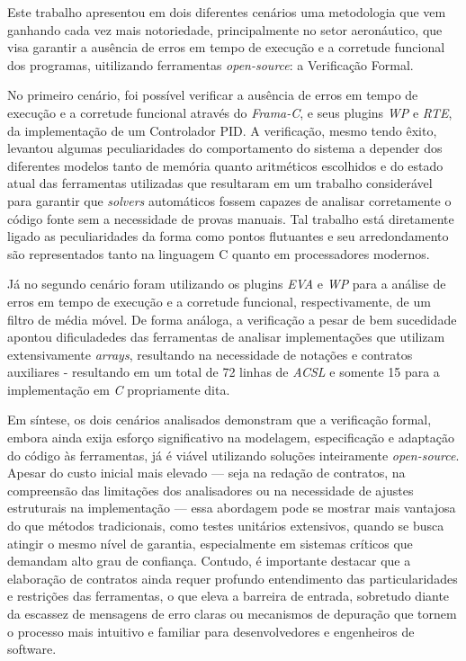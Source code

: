 \documentclass{article}
\begin{document}
Este trabalho apresentou em dois diferentes cenários uma metodologia que vem ganhando cada vez mais notoriedade, principalmente no setor aeronáutico,
que visa garantir a ausência de erros em tempo de execução e a corretude funcional dos programas, uitilizando ferramentas \emph{open-source}: a Verificação Formal.

No primeiro cenário, foi possível verificar a ausência de erros em tempo de execução e a corretude funcional através do \emph{Frama-C}, e seus plugins \emph{WP} e \emph{RTE}, da implementação de um
Controlador PID.
A verificação, mesmo tendo êxito, levantou algumas peculiaridades do comportamento do sistema a depender dos diferentes modelos tanto de memória quanto aritméticos escolhidos e do estado atual das ferramentas utilizadas que resultaram em um trabalho considerável para garantir que \emph{solvers} automáticos
fossem capazes de analisar corretamente o código fonte sem a necessidade de provas manuais. Tal trabalho está diretamente ligado as 
peculiaridades da forma como pontos flutuantes e seu arredondamento são representados tanto na linguagem C quanto em processadores modernos. 

Já no segundo cenário foram utilizando os plugins \emph{EVA} e \emph{WP} para a análise de erros em tempo de execução e a corretude funcional, respectivamente, de um filtro de média móvel.
De forma análoga, a verificação a pesar de bem sucedidade apontou dificuladedes das ferramentas de analisar implementações que utilizam extensivamente 
\emph{arrays}, resultando na necessidade de notações e contratos auxiliares - resultando em um total de 72 linhas de \emph{ACSL} e somente 15 para a implementação em \emph{C} propriamente dita.

Em síntese, os dois cenários analisados demonstram que a verificação formal, embora ainda exija esforço significativo na modelagem, especificação e adaptação do código às ferramentas, já é 
viável utilizando soluções inteiramente \emph{open-source}. Apesar do custo inicial mais elevado — seja na redação de contratos, na compreensão das limitações dos analisadores ou na necessidade de ajustes
estruturais na implementação — essa abordagem pode se mostrar mais vantajosa do que métodos tradicionais, como testes unitários extensivos, quando se busca atingir o mesmo nível de garantia,
especialmente em sistemas críticos que demandam alto grau de confiança. Contudo, é importante destacar que a elaboração de contratos ainda requer profundo entendimento das particularidades e
restrições das ferramentas, o que eleva a barreira de entrada, sobretudo diante da escassez de mensagens de erro claras ou mecanismos de depuração que tornem o processo mais intuitivo e familiar para
desenvolvedores e engenheiros de software.

\newpage
\printbibliography[title={Referências}]
\end{document}
